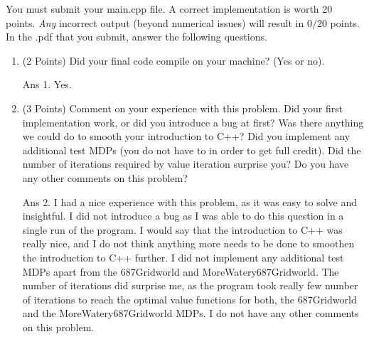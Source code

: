 \documentclass[]{article}
\begin{document}
You must submit your main.cpp file. A correct implementation is worth 20 points. \textit{Any} incorrect output (beyond numerical issues) will result in $0/20$ points. In the .pdf that you submit, answer the following questions.

\begin{enumerate}
    \item (2 Points) Did your final code compile on your machine? (Yes or no).

	{
		\color{blue}
		Ans 1. Yes.
	}

    \item (3 Points) Comment on your experience with this problem. Did your first implementation work, or did you introduce a bug at first? Was there anything we could do to smooth your introduction to C++? Did you implement any additional test MDPs (you do not have to in order to get full credit). Did the number of iterations required by value iteration surprise you? Do you have any other comments on this problem?

	{
		\color{blue}
		Ans 2. I had a nice experience with this problem, as it was easy to solve and insightful. I did not introduce a bug as I was able to do this question in a single run of the program. I would say that the introduction to C++ was really nice, and I do not think anything more needs to be done to smoothen the introduction to C++ further. I did not implement any additional test MDPs apart from the 687Gridworld and MoreWatery687Gridworld. The number of iterations did surprise me, as the program took really few number of iterations to reach the optimal value functions for both, the 687Gridworld and the MoreWatery687Gridworld MDPs. I do not have any other comments on this problem.
	}

\end{enumerate}
\end{document}
